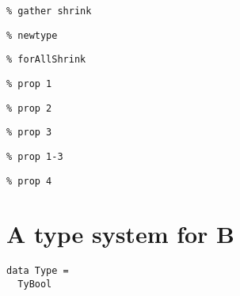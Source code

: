 \documentclass{beamer}
\begin{document}
\begin{frame}[fragile]
  \begin{verbatim}
% gather shrink
  \end{verbatim}
\end{frame}

\begin{frame}[fragile]
  \begin{verbatim}
% newtype
  \end{verbatim}
\end{frame}

\begin{frame}[fragile]
  \begin{verbatim}
% forAllShrink
  \end{verbatim}
\end{frame}


\begin{frame}[fragile]
  \begin{verbatim}
% prop 1
  \end{verbatim}
\end{frame}

\begin{frame}[fragile]
  \begin{verbatim}
% prop 2
  \end{verbatim}
\end{frame}

\begin{frame}[fragile]
  \begin{verbatim}
% prop 3
  \end{verbatim}
\end{frame}

\begin{frame}[fragile]
  \begin{verbatim}
% prop 1-3
  \end{verbatim}
\end{frame}

\begin{frame}[fragile]
  \begin{verbatim}
% prop 4
  \end{verbatim}
\end{frame}

\section{A type system for B}

\begin{frame}[fragile]
  \begin{verbatim}
data Type =
  TyBool
  \end{verbatim}
\end{frame}
\end{document}
